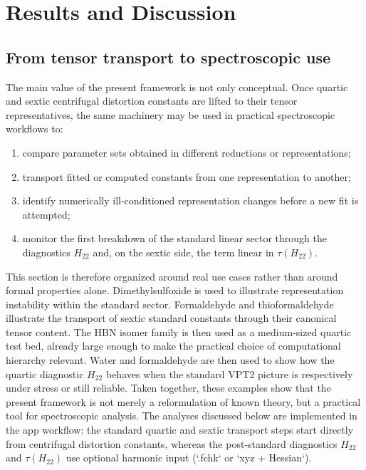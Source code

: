 \section{Results and Discussion}

\subsection{From tensor transport to spectroscopic use}

The main value of the present framework is not only conceptual. Once quartic
and sextic centrifugal distortion constants are lifted to their tensor
representatives, the same machinery may be used in practical spectroscopic
workflows to:
\begin{enumerate}
\item compare parameter sets obtained in different reductions or
representations;
\item transport fitted or computed constants from one representation to
another;
\item identify numerically ill-conditioned representation changes before a new
fit is attempted;
\item monitor the first breakdown of the standard linear sector through the
diagnostics $H_{22}$ and, on the sextic side, the term linear in
$\tau(H_{22})$.
\end{enumerate}

This section is therefore organized around real use cases rather than around
formal properties alone. Dimethylsulfoxide is used to illustrate
representation instability within the standard sector. Formaldehyde and
thioformaldehyde illustrate the transport of sextic standard constants through
their canonical tensor content. The HBN isomer family is then used as a
medium-sized quartic test bed, already large enough to make the practical
choice of computational hierarchy relevant. Water and formaldehyde are then
used to show how the quartic diagnostic $H_{22}$ behaves when the standard
VPT2 picture is respectively under stress or still reliable. Taken together,
these examples show that the present framework is not merely a reformulation
of known theory, but a practical tool for spectroscopic analysis. The analyses
discussed below are implemented in the app workflow: the standard quartic and
sextic transport steps start directly from centrifugal distortion constants,
whereas the post-standard diagnostics $H_{22}$ and $\tau(H_{22})$ use
optional harmonic input (`.fchk` or `xyz + Hessian`).

